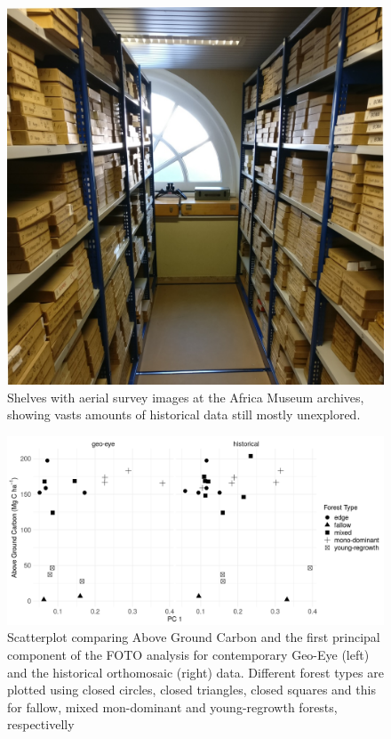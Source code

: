 \documentclass[landscape]{article}
\begin{document}
\begin{figure}

{\centering \includegraphics[height=0.75\textheight]{./figures/archives_aerial_photos_2} 

}

\caption{Shelves with aerial survey images at the Africa Museum archives, showing vasts amounts of historical data still mostly unexplored.}\label{fig:unnamed-chunk-6}
\end{figure}

\begin{figure}

{\centering \includegraphics[width=0.75\linewidth]{./figures/foto_pc1_agc} 

}

\caption{Scatterplot comparing Above Ground Carbon and the first principal component of the FOTO analysis for contemporary Geo-Eye (left) and the historical orthomosaic (right) data. Different forest types are plotted using closed circles, closed triangles, closed squares and this for fallow, mixed mon-dominant and young-regrowth forests, respectivelly }\label{fig:unnamed-chunk-7}
\end{figure}
\end{document}
